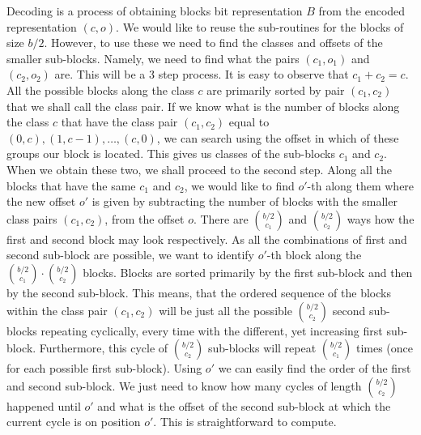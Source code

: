 Decoding is a process of obtaining blocks bit representation $B$ from the encoded
representation $(c, o)$. We would like to reuse the sub-routines for the blocks
of size $b/2$. However, to use these we need to find the classes and offsets of
the smaller sub-blocks. Namely, we need to find what the pairs $(c_1, o_1)$ and
$(c_2, o_2)$ are. This will be a 3 step process. It is easy to observe that $c_1 + c_2 = c$.
All the possible blocks along the class $c$ are primarily sorted by pair $(c_1, c_2)$
that we shall call the class pair. If we know what is the number of blocks along the class $c$
that have the class pair $(c_1, c_2)$ equal to $(0, c), (1, c-1), \ldots , (c, 0)$, we can search
using the offset in which of these groups our block is located. This gives us classes of the sub-blocks
$c_1$ and $c_2$. When we obtain these two, we shall proceed to the second step. Along all the blocks
that have the same $c_1$ and $c_2$, we would like to find $o'$-th along them where the new offset $o'$
is given by subtracting the number of blocks with the smaller class pairs $(c_1, c_2)$, from the offset
$o$. There are ${b/2 \choose c_1}$ and ${b/2 \choose c_2}$ ways how the first and second block may look
respectively. As all the combinations of first and second sub-block are possible, we want to identify
$o'$-th block along the ${b/2 \choose c_1}\cdot {b/2 \choose c_2}$ blocks. Blocks are sorted primarily
by the first sub-block and then by the second sub-block. This means, that the ordered sequence of
the blocks within the class pair $(c_1, c_2)$ will be just all the possible ${b/2 \choose c_2}$
second sub-blocks repeating cyclically, every time with the different, yet increasing
first sub-block. Furthermore, this cycle of ${b/2 \choose c_2}$ sub-blocks will repeat
${b/2 \choose c_1}$ times (once for each possible first sub-block). Using $o'$ we can easily
find the order of the first and second sub-block. We just need to know how many cycles of length
${b/2 \choose c_2}$ happened until $o'$ and what is the offset of the second sub-block at which
the current cycle is on position $o'$. This is straightforward to compute.


